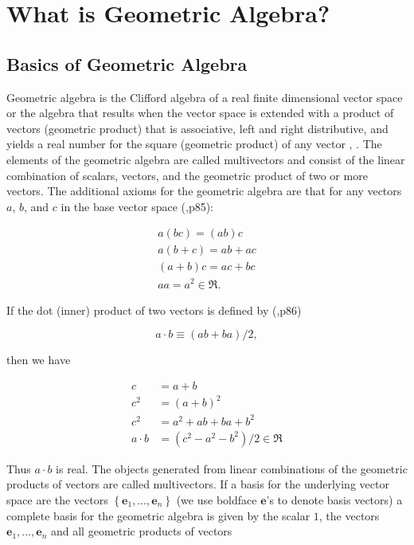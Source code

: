 \documentclass[12pt]{report}
\newcommand{\bm}[1]{\boldsymbol{#1}}
\newcommand{\lp}{\left (}
\newcommand{\rp}{\right )}
\newcommand{\lbrc}{\left \{}
\newcommand{\rbrc}{\right \}}
\newcommand{\set}[1]{\lbrc {#1} \rbrc}
\newcommand{\eb}{\bm{e}}
\begin{document}
\chapter{What is Geometric Algebra?}

\section{Basics of Geometric Algebra}

Geometric algebra is the Clifford algebra of a real finite dimensional vector
space or the algebra that results when the vector space
is extended with a product of vectors (geometric product) that is associative,
left and right distributive, and yields a real number for the square (geometric
product) of any vector \cite{Hestenes}, \cite{Doran}.  The elements of the geometric
algebra are called multivectors and consist of the linear combination of
scalars, vectors, and the geometric product of two or more vectors. The
additional axioms for the geometric algebra are that for any vectors $a$,
$b$, and $c$ in the base vector space (\cite{Doran},p85):

  \begin{equation}
  \begin{array}{c}
  a\lp bc \rp = \lp ab \rp c \\
  a\lp b+c \rp = ab+ac \\
  \lp a + b \rp c = ac+bc \\
  aa = a^{2} \in \Re.
  \end{array}
  \end{equation}

If the dot (inner) product of two vectors is defined by (\cite{Doran},p86)

  \begin{equation}
     a\cdot b \equiv (ab+ba)/2,
  \end{equation}

then we have

  \begin{align}
     c &= a+b \\
     c^{2} &= (a+b)^{2} \\
     c^{2} &= a^{2}+ab+ba+b^{2} \\
     a\cdot b &= (c^{2}-a^{2}-b^{2})/2 \in \Re
  \end{align}

Thus $a\cdot b$  is real.  The objects generated from linear combinations
of the geometric products of vectors are called multivectors.  If a basis for
the underlying vector space are the vectors $\set{\eb_{1},\dots,\eb_{n}}$ (we use
boldface $\eb$'s to denote basis vectors)
a complete basis for the geometric algebra is given by the scalar $1$, the vectors $\eb_{1},\dots,\eb_{n}$
and all geometric products of vectors
\end{document}
